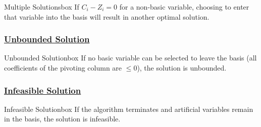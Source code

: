 \begin{prettyBox}{Multiple Solutions}{box}
If \(C_i - Z_i = 0\) for a non-basic variable, choosing to enter that variable into the basis will result in another optimal solution. 
\end{prettyBox}

\vspace{0.25cm}
\subsubsection*{\underline{Unbounded Solution}}

\begin{prettyBox}{Unbounded Solution}{box}
If no basic variable can be selected to leave the basis (all coefficients of the pivoting column are \(\leq 0\)), the solution is unbounded. 
\end{prettyBox}

\vspace{0.25cm}
\subsubsection*{\underline{Infeasible Solution}}

\begin{prettyBox}{Infeasible Solution}{box}
If the algorithm terminates and artificial variables remain in the basis, the solution is infeasible. 
\end{prettyBox}

